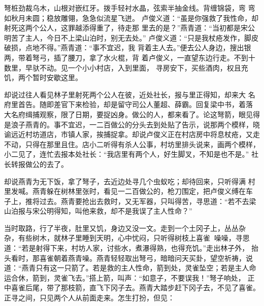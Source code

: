 弩桩劲裁乌木，山根对嵌红牙。拨手轻衬水晶，弦索半抽金线。背缠锦袋，弯
弯如秋月未圆；稳放雕翎，急急似流星飞迸。
卢俊义道：“虽是你强救了我性命，却射死这两个公人，这罪越添得重了，待走那
里去的是？”燕青道：“当初都是宋公明苦了主人，今日不上梁山泊时，别无去处。”
卢俊义道：“只是我杖疮发作，脚皮破损，点地不得。”燕青道：“事不宜迟，我
背着主人去。”便去公人身边，搜出银两，带着弩弓，插了腰刀，拿了水火棍，背
着卢俊义，一直望东边行走。不到十数里，早驮不动。见一个小小村店，入到里面，
寻房安下，买些酒肉，权且充饥，两个暂时安歇这里。

却说过往人看见林子里射死两个公人在彼，近处社长，报与里正得知，却来大
名府里首告。随即差官下来检验，却是留守司公人董超、薛霸。回复梁中书，着落
大名府缉捕观察，限了日期，要捉凶身。做公的人，都来看了。论这弩箭，眼见得
是浪子燕青的。事不宜迟，一二百做公的分头去到处贴了告示，说那两个模样，晓
谕远近村坊道店，市镇人家，挨捕捉拿。却说卢俊义正在村店房中将息杖疮，又走
不动，只得在那里且住。店小二听得有杀人公事，村坊里排头说来，画两个模样，
小二见了，连忙去报本处社长：“我店里有两个人，好生脚叉，不知是也不是。”
社长转报做公的去了。

却说燕青为无下饭，拿了弩子，去近边处寻几个虫蚁吃；却待回来，只听得满
村里发喊。燕青躲在树林里张时，看见一二百做公的，枪刀围定，把卢俊义缚在车
子上，推将过去。燕青要抢出去救时，又无军器，只叫得苦，寻思道：“若不去梁
山泊报与宋公明得知，叫他来救，却不是我误了主人性命？”

当时取路，行了半夜，肚里又饥，身边又没一文。走到一个土冈子上，丛丛杂
杂，有些树木，就林子里睡到天明，心中忧闷，只听得树枝上喜雀噪噪，寻思
道：“若是射得下来，村坊人家，讨些水，煮瀑得熟，也得充饥。”走出林子外，
抬头看时，那喜雀朝着燕青噪。燕青轻轻取出弩弓，暗暗问天买卦，望空祈祷，说
道：“燕青只有这一只箭了。若是救的主人性命，箭到处，灵雀坠空；若是主人命
运合休，箭到，灵雀飞去。”搭上箭，叫声：“如意子，不要误我！”弩子响处，
正中喜雀后尾，带了那枝箭，直飞下冈子去。燕青大踏步赶下冈子去，不见了喜雀。
正寻之间，只见两个人从前面走来。怎生打扮，但见：

